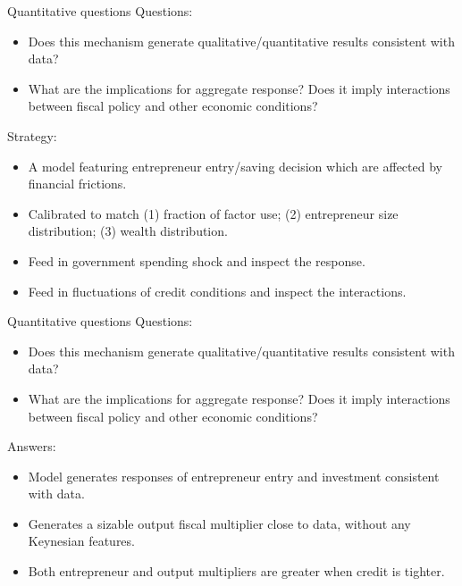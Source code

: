 \documentclass[svgnames]{beamer}
\begin{document}
\begin{frame}{Quantitative questions}
Questions:
\begin{itemize}
\item Does this mechanism generate qualitative/quantitative results consistent with data?
\item What are the implications for aggregate response? Does it imply interactions between fiscal policy and other economic conditions?
\end{itemize}
Strategy:
\begin{itemize}
\item A model featuring entrepreneur entry/saving decision which are affected by financial frictions.
\item Calibrated to match (1) fraction of factor use; (2) entrepreneur size distribution; (3) wealth distribution.
\item Feed in government spending shock and inspect the response.
\item Feed in fluctuations of credit conditions and inspect the interactions.
\end{itemize}
\end{frame}

\begin{frame}{Quantitative questions}
Questions:
\begin{itemize}
\item Does this mechanism generate qualitative/quantitative results consistent with data?
\item What are the implications for aggregate response? Does it imply interactions between fiscal policy and other economic conditions?
\end{itemize}
Answers:
\begin{itemize}
\item Model generates responses of entrepreneur entry and investment consistent with data.
\item Generates a sizable output fiscal multiplier close to data, without any Keynesian features.
\item Both entrepreneur and output multipliers are greater when credit is tighter.
\end{itemize}
\end{frame}
\end{document}
